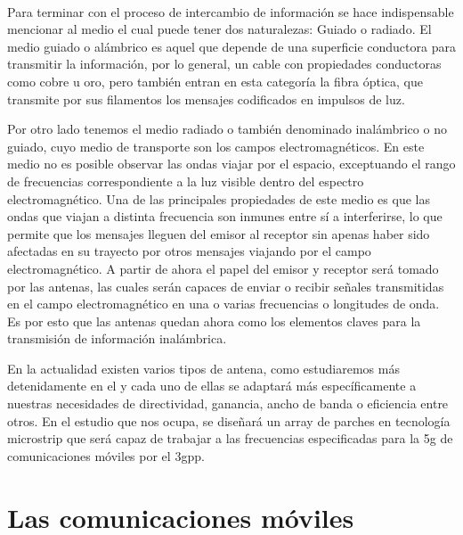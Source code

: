 \\
\par Para terminar con el proceso de intercambio de información se hace indispensable mencionar al medio el cual puede tener dos naturalezas: Guiado o radiado. El medio guiado o alámbrico es aquel que depende de una superficie conductora para transmitir la información, por lo general, un cable con propiedades conductoras como cobre u oro, pero también entran en esta categoría la fibra óptica, que transmite por sus filamentos los mensajes codificados en impulsos de luz.  
\\
\par Por otro lado tenemos el medio radiado o también denominado inalámbrico o no guiado, cuyo medio de transporte son los campos electromagnéticos. En este medio no es posible observar las ondas viajar por el espacio, exceptuando el rango de frecuencias correspondiente a la luz visible dentro del espectro electromagnético. Una de las principales propiedades de este medio es que las ondas que viajan a distinta frecuencia son inmunes entre sí a interferirse, lo que permite que los mensajes lleguen del emisor al receptor sin apenas haber sido afectadas en su trayecto por otros mensajes viajando por el campo electromagnético. A partir de ahora el papel del emisor y receptor será tomado por las antenas, las cuales serán capaces de enviar o recibir señales transmitidas en el campo electromagnético en una o varias frecuencias o longitudes de onda. Es por esto que las antenas quedan ahora como los elementos claves para la transmisión de información inalámbrica. 
\\ 
\par En la actualidad existen varios tipos de antena, como estudiaremos más detenidamente en el  y cada uno de ellas se adaptará más específicamente a nuestras necesidades de directividad, ganancia, ancho de banda o eficiencia entre otros. En el estudio que nos ocupa, se diseñará un array de parches en tecnología microstrip que será capaz de trabajar a las frecuencias especificadas para la \gls{5g} de comunicaciones móviles por el \gls{3gpp}.

\section{Las comunicaciones móviles}

